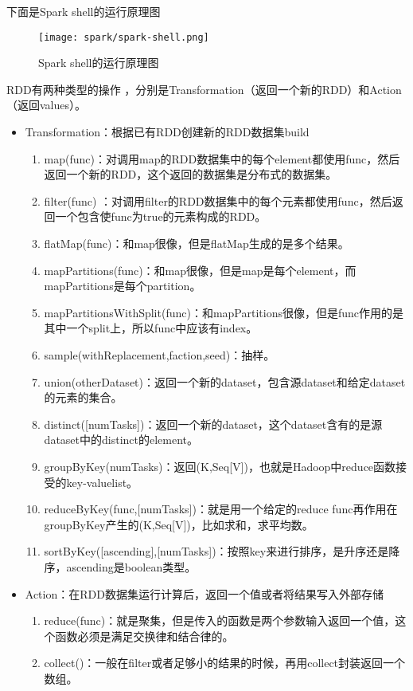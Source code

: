 下面是Spark shell的运行原理图

\begin{figure}[htbp]
    \centering
    \texttt{[image: spark/spark-shell.png]}    
    \caption{Spark shell的运行原理图}
    \label{fig:spark_shell}
\end{figure}
RDD有两种类型的操作 ，分别是Transformation（返回一个新的RDD）和Action（返回values）。
\begin{itemize}
    \item Transformation：根据已有RDD创建新的RDD数据集build

\begin{enumerate}[1)]
\item map(func)：对调用map的RDD数据集中的每个element都使用func，然后返回一个新的RDD，这个返回的数据集是分布式的数据集。
\item filter(func) ：对调用filter的RDD数据集中的每个元素都使用func，然后返回一个包含使func为true的元素构成的RDD。
\item flatMap(func)：和map很像，但是flatMap生成的是多个结果。
\item mapPartitions(func)：和map很像，但是map是每个element，而mapPartitions是每个partition。
\item mapPartitionsWithSplit(func)：和mapPartitions很像，但是func作用的是其中一个split上，所以func中应该有index。
\item sample(withReplacement,faction,seed)：抽样。
\item union(otherDataset)：返回一个新的dataset，包含源dataset和给定dataset的元素的集合。
\item distinct([numTasks])：返回一个新的dataset，这个dataset含有的是源dataset中的distinct的element。
\item groupByKey(numTasks)：返回(K,Seq[V])，也就是Hadoop中reduce函数接受的key-valuelist。
\item reduceByKey(func,[numTasks])：就是用一个给定的reduce func再作用在groupByKey产生的(K,Seq[V])，比如求和，求平均数。
\item sortByKey([ascending],[numTasks])：按照key来进行排序，是升序还是降序，ascending是boolean类型。
\end{enumerate}
\item  Action：在RDD数据集运行计算后，返回一个值或者将结果写入外部存储
\begin{enumerate}[1)]
\item reduce(func)：就是聚集，但是传入的函数是两个参数输入返回一个值，这个函数必须是满足交换律和结合律的。
\item collect()：一般在filter或者足够小的结果的时候，再用collect封装返回一个数组。

\end{enumerate}
\end{itemize}
